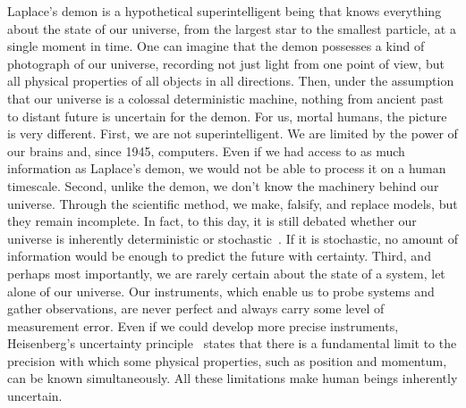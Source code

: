 Laplace's demon is a hypothetical superintelligent being that knows everything about the state of our universe, from the largest star to the smallest particle, at a single moment in time. One can imagine that the demon possesses a kind of photograph of our universe, recording not just light from one point of view, but all physical properties of all objects in all directions. Then, under the assumption that our universe is a colossal deterministic machine, nothing from ancient past to distant future is uncertain for the demon. For us, mortal humans, the picture is very different. First, we are not superintelligent. We are limited by the power of our brains and, since 1945, computers. Even if we had access to as much information as Laplace's demon, we would not be able to process it on a human timescale. Second, unlike the demon, we don't know the machinery behind our universe. Through the scientific method, we make, falsify, and replace models, but they remain incomplete. In fact, to this day, it is still debated whether our universe is inherently deterministic or stochastic~\cite{bell1964einstein, genovese2005research, larsson2014loopholes}. If it is stochastic, no amount of information would be enough to predict the future with certainty. Third, and perhaps most importantly, we are rarely certain about the state of a system, let alone of our universe. Our instruments, which enable us to probe systems and gather observations, are never perfect and always carry some level of measurement error. Even if we could develop more precise instruments, Heisenberg's uncertainty principle~\cite{heisenberg1927ueber} states that there is a fundamental limit to the precision with which some physical properties, such as position and momentum, can be known simultaneously. All these limitations make human beings inherently uncertain.

